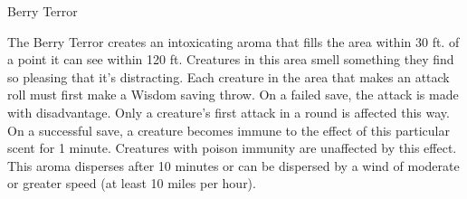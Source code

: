 \begin{DndMonster}[width=0.5\textwidth]{Berry Terror}
    \DndMonsterAttack[
      name=Berry Bomb,
      distance=ranged, %
      mod=+4,
      range=30/80,
      targets=one target,
      dmg=\DndDice{1},
      dmg-type=bludgeoning,
      extra={. When the berry hits a creature or falls on the ground it explodes in a 20 ft. radius. Each creature within the explosion radius must succeed on a DC 15 Constitution Saving Throw or take \DndDice{2d6} poison damage or half as much on a failed one},
    ]
    
    The Berry Terror creates an intoxicating aroma that fills the area within 30 ft. of a point it can see within 120 ft. Creatures in this area smell something they find so pleasing that it's distracting. Each creature in the area that makes an attack roll must first make a Wisdom saving throw. On a failed save, the attack is made with disadvantage. Only a creature's first attack in a round is affected this way. On a successful save, a creature becomes immune to the effect of this particular scent for 1 minute. Creatures with poison immunity are unaffected by this effect. This aroma disperses after 10 minutes or can be dispersed by a wind of moderate or greater speed  (at least 10 miles per hour).
\end{DndMonster}


